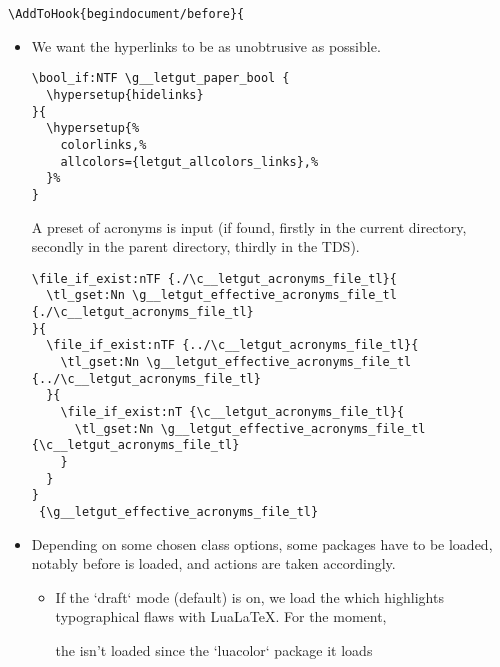\documentclass{letgut}
\begin{document}
\begin{lstlisting}
\AddToHook{begindocument/before}{
\end{lstlisting}

\begin{itemize}
\item We want the hyperlinks to be as unobtrusive as possible.
\begin{lstlisting}
\bool_if:NTF \g__letgut_paper_bool {
  \hypersetup{hidelinks}
}{
  \hypersetup{%
    colorlinks,%
    allcolors={letgut_allcolors_links},%
  }%
}
\end{lstlisting}

A preset of acronyms is input (if found, firstly in the current directory,
secondly in the parent directory, thirdly in the TDS).
\begin{lstlisting}
\file_if_exist:nTF {./\c__letgut_acronyms_file_tl}{
  \tl_gset:Nn \g__letgut_effective_acronyms_file_tl {./\c__letgut_acronyms_file_tl}
}{
  \file_if_exist:nTF {../\c__letgut_acronyms_file_tl}{
    \tl_gset:Nn \g__letgut_effective_acronyms_file_tl {../\c__letgut_acronyms_file_tl}
  }{
    \file_if_exist:nT {\c__letgut_acronyms_file_tl}{
      \tl_gset:Nn \g__letgut_effective_acronyms_file_tl {\c__letgut_acronyms_file_tl}
    }
  }
}
 {\g__letgut_effective_acronyms_file_tl}
\end{lstlisting}

\item Depending on some chosen class options, some packages have to be loaded,
notably before  is loaded, and actions are taken
accordingly.
\begin{itemize}
\item If the `draft` mode (default) is on, we load the  which
highlights typographical flaws with LuaLaTeX. For the moment,

the  isn't loaded since  the `luacolor`
package it loads


\end{itemize}
\end{itemize}
\end{document}
